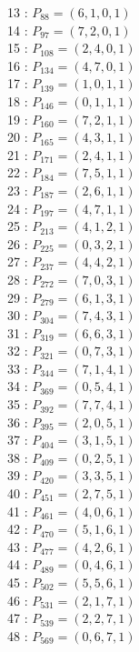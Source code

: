 \documentclass{article}
\begin{document}
{\begin{multicols}{2}
13 : $P_{88}=( 6, 1, 0, 1 )$\\
14 : $P_{97}=( 7, 2, 0, 1 )$\\
15 : $P_{108}=( 2, 4, 0, 1 )$\\
16 : $P_{134}=( 4, 7, 0, 1 )$\\
17 : $P_{139}=( 1, 0, 1, 1 )$\\
18 : $P_{146}=( 0, 1, 1, 1 )$\\
19 : $P_{160}=( 7, 2, 1, 1 )$\\
20 : $P_{165}=( 4, 3, 1, 1 )$\\
21 : $P_{171}=( 2, 4, 1, 1 )$\\
22 : $P_{184}=( 7, 5, 1, 1 )$\\
23 : $P_{187}=( 2, 6, 1, 1 )$\\
24 : $P_{197}=( 4, 7, 1, 1 )$\\
25 : $P_{213}=( 4, 1, 2, 1 )$\\
26 : $P_{225}=( 0, 3, 2, 1 )$\\
27 : $P_{237}=( 4, 4, 2, 1 )$\\
28 : $P_{272}=( 7, 0, 3, 1 )$\\
29 : $P_{279}=( 6, 1, 3, 1 )$\\
30 : $P_{304}=( 7, 4, 3, 1 )$\\
31 : $P_{319}=( 6, 6, 3, 1 )$\\
32 : $P_{321}=( 0, 7, 3, 1 )$\\
33 : $P_{344}=( 7, 1, 4, 1 )$\\
34 : $P_{369}=( 0, 5, 4, 1 )$\\
35 : $P_{392}=( 7, 7, 4, 1 )$\\
36 : $P_{395}=( 2, 0, 5, 1 )$\\
37 : $P_{404}=( 3, 1, 5, 1 )$\\
38 : $P_{409}=( 0, 2, 5, 1 )$\\
39 : $P_{420}=( 3, 3, 5, 1 )$\\
40 : $P_{451}=( 2, 7, 5, 1 )$\\
41 : $P_{461}=( 4, 0, 6, 1 )$\\
42 : $P_{470}=( 5, 1, 6, 1 )$\\
43 : $P_{477}=( 4, 2, 6, 1 )$\\
44 : $P_{489}=( 0, 4, 6, 1 )$\\
45 : $P_{502}=( 5, 5, 6, 1 )$\\
46 : $P_{531}=( 2, 1, 7, 1 )$\\
47 : $P_{539}=( 2, 2, 7, 1 )$\\
48 : $P_{569}=( 0, 6, 7, 1 )$\\
\end{multicols}
}
\end{document}
